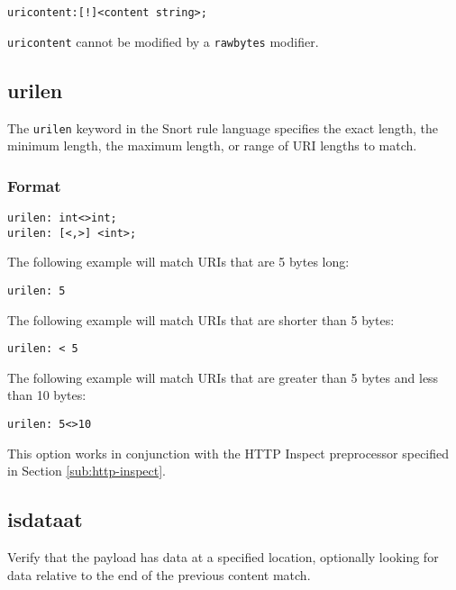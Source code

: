 \documentclass[english]{report}
\newenvironment{note}{
\samepage
    \vspace{10pt}{\textsf{
        {\hspace{7pt}\Huge{$\triangle$\hspace{-12.5pt}{\Large{$^!$}}}}\hspace{5pt}
        {\Large{NOTE}}
    }
    }
   \begin{center}
    \par\vspace{-17pt}

    \begin{lrbox}{\savepar}
    \begin{minipage}[r]{6in}
}
{
    \end{minipage}
    \end{lrbox}
    \fbox{
        \usebox{
            \savepar
	}
    }
    \par\vskip10pt
    \end{center}
}
\newenvironment{note}{
        \begin{rawhtml}
        <p><table border="1"><tr><td><b>
        Note:&nbsp;&nbsp;</b>
        \end{rawhtml}
}{
        \begin{rawhtml}
        </b></td></tr></table></p>
        \end{rawhtml}
}
\begin{document}
\begin{verbatim}
uricontent:[!]<content string>;
\end{verbatim}

\begin{note}
\texttt{uricontent} cannot be modified by a \texttt{rawbytes} modifier.
\end{note}

\subsection{urilen}

The \texttt{urilen} keyword in the Snort rule language specifies the exact length,
the minimum length, the maximum length, or range of URI lengths to match.  

\subsubsection{Format}

\begin{verbatim}
urilen: int<>int;
urilen: [<,>] <int>;
\end{verbatim}

The following example will match URIs that are 5 bytes long:

\begin{verbatim}urilen: 5\end{verbatim}

The following example will match URIs that are shorter than 5 bytes:

\begin{verbatim}urilen: < 5\end{verbatim}

The following example will match URIs that are greater than 5 bytes and less than 10 bytes:

\begin{verbatim}urilen: 5<>10\end{verbatim}

This option works in conjunction with the HTTP Inspect preprocessor specified
in Section \ref{sub:http-inspect}.

\subsection{isdataat}

Verify that the payload has data at a specified location, optionally looking for data relative to the end of the previous content match.
\end{document}
